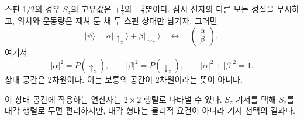 \begin{classroomqa}
\end{classroomqa}

스핀 1/2의 경우 \(S_z\)의 고유값은 \(+\tfrac12\)와 \(-\tfrac12\)뿐이다. 잠시 전자의 다른 모든 성질을 무시하고, 위치와 운동량은 제쳐 둔 채 두 스핀 상태만 남기자. 그러면
\begin{equation}
|\psi\rangle
=
\alpha|\uparrow_z\rangle+\beta|\downarrow_z\rangle
\quad\longleftrightarrow\quad
\begin{pmatrix}
\alpha\\
\beta
\end{pmatrix},
\end{equation}
여기서
\begin{equation}
|\alpha|^2=P(\uparrow_z),
\qquad
|\beta|^2=P(\downarrow_z),
\qquad
|\alpha|^2+|\beta|^2=1.
\end{equation}
상태 공간은 2차원이다. 이는 보통의 공간이 2차원이라는 뜻이 아니다.

\begin{classroomqa}
\end{classroomqa}

이 상태 공간에 작용하는 연산자는 \(2\times2\) 행렬로 나타낼 수 있다. \(S_z\) 기저를 택해 \(S_z\)를 대각 행렬로 두면 편리하지만, 대각 형태는 물리적 요건이 아니라 기저 선택의 결과다.

\begin{classroomqa}
\end{classroomqa}

\begin{classroomqa}
\end{classroomqa}

